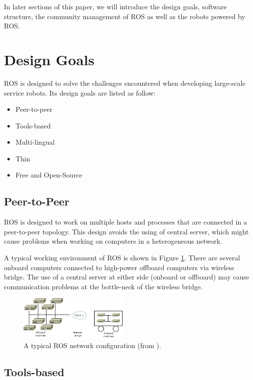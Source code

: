 \documentclass[a4paper, 10pt, conference]{ieeeconf}       %
\begin{document}
In later sections of this paper, we will introduce the design goals, software structure, the community management of ROS as well as the robots powered by ROS. 

\section{Design Goals}

ROS is designed to solve the challenges encountered when developing large-scale service robots\cite{quigley_ros:_2009}. Its design goals are listed as follow:
\begin{itemize}
  \item Peer-to-peer
  \item Tools-based
  \item Multi-lingual
  \item Thin
  \item Free and Open-Source
\end{itemize}

\subsection{Peer-to-Peer}

ROS is designed to work on multiple hosts and processes that are connected in a peer-to-peer topology. This design avoids the using of central server, which might cause problems when working on computers in a heterogeneous network.

A typical working environment of ROS is shown in Figure \ref{fig:network}. There are several onboard computers connected to high-power offboard computers via wireless bridge. The use of a central server at either side (onboard or offboard) may cause communication problems at the bottle-neck of the wireless bridge.

\begin{figure}[htpb]
  \centering
  \includegraphics[width=0.48\textwidth]{network}
  \caption{A typical ROS network configuration (from \cite{quigley_ros:_2009}).}
  \label{fig:network}
\end{figure}

\subsection{Tools-based} 
\end{document}
